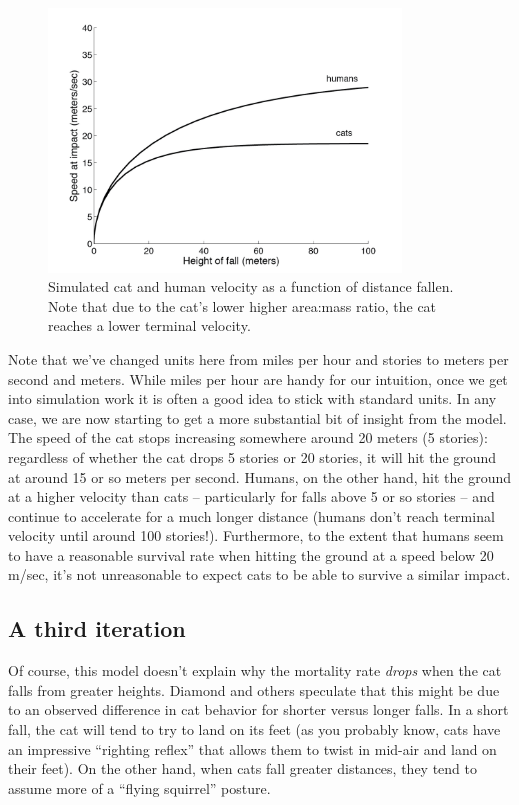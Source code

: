 \begin{figure}

\centerline{\includegraphics[height=7cm]{figs/CatSpeed}}
\caption{Simulated cat and human velocity as a function of distance fallen.  Note that due to the cat's lower higher area:mass ratio, the cat reaches a lower terminal velocity. }

\end{figure}

Note that we've changed units here from miles per hour and stories to meters per second and meters.  While miles per hour are handy for our intuition, once we get into simulation work it is often a good idea to stick with standard units.  In any case, we are now starting to get a more substantial bit of insight from the model.  The speed of the cat stops increasing somewhere around 20 meters (5 stories): regardless of whether the cat drops 5 stories or 20 stories, it will hit the ground at around 15 or so meters per second.  Humans, on the other hand, hit the ground at a higher velocity than cats -- particularly for falls above 5 or so stories -- and continue to accelerate for a much longer distance (humans don't reach terminal velocity until around 100 stories!).  Furthermore, to the extent that humans seem to have a reasonable survival rate when hitting the ground at a speed below 20 m/sec, it's not unreasonable to expect cats to be able to survive a similar impact.  

\subsection{A third iteration}

Of course, this model doesn't explain why the mortality rate {\it drops} when the cat falls from greater heights.  Diamond and others speculate that this might be due to an observed difference in cat behavior for shorter versus longer falls.  In a short fall, the cat will tend to try to land on its feet (as you probably know, cats have an impressive ``righting reflex'' that allows them to twist in mid-air and land on their feet).  On the other hand, when cats fall greater distances, they tend to assume more of a ``flying squirrel'' posture.  

